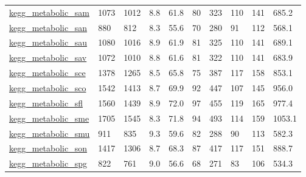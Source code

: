 \begin{longtable}{llllllllll}
 \href{http://santafe.edu/~aaronc/data/kegg2006_metabolic.zip}{kegg\_metabolic\_sam}                                          & 1073       & 1012  & 8.8    & 61.8   & 80    & 323    & 110    & 141    & 685.2   \\
 \href{http://santafe.edu/~aaronc/data/kegg2006_metabolic.zip}{kegg\_metabolic\_san}                                          & 880        & 812   & 8.3    & 55.6   & 70    & 280    & 91     & 112    & 568.1   \\
 \href{http://santafe.edu/~aaronc/data/kegg2006_metabolic.zip}{kegg\_metabolic\_sau}                                          & 1080       & 1016  & 8.9    & 61.9   & 81    & 325    & 110    & 141    & 689.1   \\
 \href{http://santafe.edu/~aaronc/data/kegg2006_metabolic.zip}{kegg\_metabolic\_sav}                                          & 1072       & 1010  & 8.8    & 61.6   & 81    & 322    & 110    & 141    & 683.9   \\
 \href{http://santafe.edu/~aaronc/data/kegg2006_metabolic.zip}{kegg\_metabolic\_sce}                                          & 1378       & 1265  & 8.5    & 65.8   & 75    & 387    & 117    & 158    & 853.1   \\
 \href{http://santafe.edu/~aaronc/data/kegg2006_metabolic.zip}{kegg\_metabolic\_sco}                                          & 1542       & 1413  & 8.7    & 69.9   & 92    & 447    & 107    & 145    & 956.0   \\
 \href{http://santafe.edu/~aaronc/data/kegg2006_metabolic.zip}{kegg\_metabolic\_sfl}                                          & 1560       & 1439  & 8.9    & 72.0   & 97    & 455    & 119    & 165    & 977.4   \\
 \href{http://santafe.edu/~aaronc/data/kegg2006_metabolic.zip}{kegg\_metabolic\_sme}                                          & 1705       & 1545  & 8.3    & 71.8   & 94    & 493    & 114    & 159    & 1053.1  \\
 \href{http://santafe.edu/~aaronc/data/kegg2006_metabolic.zip}{kegg\_metabolic\_smu}                                          & 911        & 835   & 9.3    & 59.6   & 82    & 288    & 90     & 113    & 582.3   \\
 \href{http://santafe.edu/~aaronc/data/kegg2006_metabolic.zip}{kegg\_metabolic\_son}                                          & 1417       & 1306  & 8.7    & 68.3   & 87    & 417    & 117    & 151    & 888.7   \\
 \href{http://santafe.edu/~aaronc/data/kegg2006_metabolic.zip}{kegg\_metabolic\_spg}                                          & 822        & 761   & 9.0    & 56.6   & 68    & 271    & 83     & 106    & 534.3   \\

\end{longtable}

